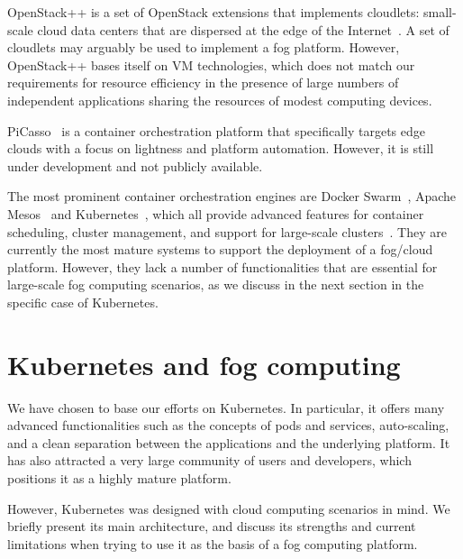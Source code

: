 \documentclass[letterpaper,twocolumn,10pt]{article}
\begin{document}

OpenStack++ is a set of OpenStack extensions that implements
cloudlets: small-scale cloud data centers that are dispersed at the
edge of the Internet~\cite{openstackplusplus}. A set of cloudlets may
arguably be used to implement a fog platform. However, OpenStack++
bases itself on VM technologies, which does not match our requirements
for resource efficiency in the presence of large numbers of
independent applications sharing the resources of modest computing
devices.

PiCasso~\cite{picasso} is a container orchestration platform that
specifically targets edge clouds with a focus on lightness and
platform automation. However, it is still under development and not
publicly available.

The most prominent container orchestration engines are Docker
Swarm~\cite{swarm}, Apache Mesos~\cite{mesos} and
Kubernetes~\cite{burns2016borg}, which all provide advanced features
for container scheduling, cluster management, and support for
large-scale clusters~\cite{kub-vs-swarm}. They are currently the most
mature systems to support the deployment of a fog/cloud
platform. However, they lack a number of functionalities that are
essential for large-scale fog computing scenarios, as we discuss in
the next section in the specific case of Kubernetes.

  
\section{Kubernetes and fog computing}\label{sec:kube}

We have chosen to base our efforts on Kubernetes.  In particular, it
offers many advanced functionalities such as the concepts of pods and
services, auto-scaling, and a clean separation between the
applications and the underlying platform. It has also attracted a very
large community of users and developers, which positions it as a highly
mature platform.

However, Kubernetes was designed with cloud computing scenarios in
mind. We briefly present its main architecture, and discuss its
strengths and current limitations when trying to use it as the basis
of a fog computing platform.
\end{document}
